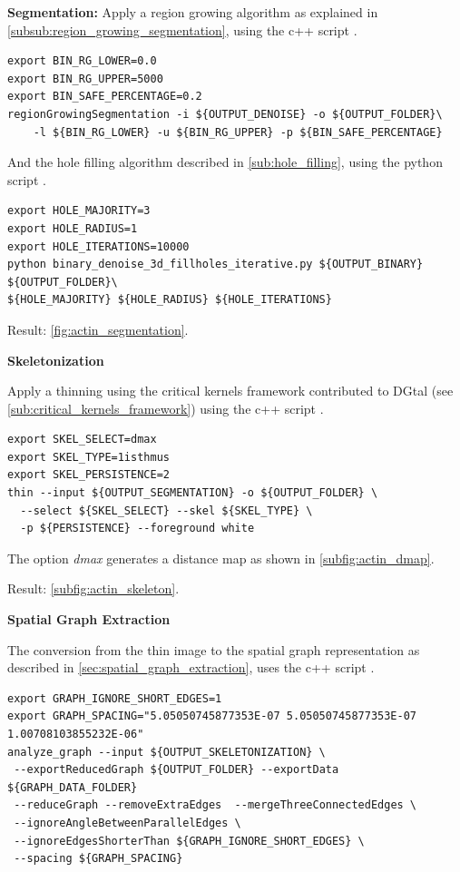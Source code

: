 \textbf{Segmentation:}
Apply a region growing algorithm as explained in \autoref{subsub:region_growing_segmentation},
using the c++ script   \cite{phcerdan_regionGrowingSegmentation_2018}.
\begin{verbatim}
export BIN_RG_LOWER=0.0
export BIN_RG_UPPER=5000
export BIN_SAFE_PERCENTAGE=0.2
regionGrowingSegmentation -i ${OUTPUT_DENOISE} -o ${OUTPUT_FOLDER}\
    -l ${BIN_RG_LOWER} -u ${BIN_RG_UPPER} -p ${BIN_SAFE_PERCENTAGE}
\end{verbatim}

And the hole filling algorithm described in \autoref{sub:hole_filling},
using the python script   \cite{phcerdan_binary_denoise_3d_fillholes_iterative_2018}.

\begin{verbatim}
export HOLE_MAJORITY=3
export HOLE_RADIUS=1
export HOLE_ITERATIONS=10000
python binary_denoise_3d_fillholes_iterative.py ${OUTPUT_BINARY} ${OUTPUT_FOLDER}\
${HOLE_MAJORITY} ${HOLE_RADIUS} ${HOLE_ITERATIONS}
\end{verbatim}

Result: \autoref{fig:actin_segmentation}.

\textbf{Skeletonization}

Apply a thinning using the critical kernels framework contributed to DGtal (see \autoref{sub:critical_kernels_framework})
using the c++ script   \cite{phcerdan_thin_2018}.

\begin{verbatim}
export SKEL_SELECT=dmax
export SKEL_TYPE=1isthmus
export SKEL_PERSISTENCE=2
thin --input ${OUTPUT_SEGMENTATION} -o ${OUTPUT_FOLDER} \
  --select ${SKEL_SELECT} --skel ${SKEL_TYPE} \
  -p ${PERSISTENCE} --foreground white
\end{verbatim}

The option \textit{dmax} generates a distance map as shown in \autoref{subfig:actin_dmap}.

Result: \autoref{subfig:actin_skeleton}.

\textbf{Spatial Graph Extraction}

The conversion from the thin image to the spatial graph representation as described in \autoref{sec:spatial_graph_extraction},
uses the c++ script   \cite{phcerdan_analyze_graph_2018}.

\begin{verbatim}
export GRAPH_IGNORE_SHORT_EDGES=1
export GRAPH_SPACING="5.05050745877353E-07 5.05050745877353E-07 1.00708103855232E-06"
analyze_graph --input ${OUTPUT_SKELETONIZATION} \
 --exportReducedGraph ${OUTPUT_FOLDER} --exportData ${GRAPH_DATA_FOLDER}
 --reduceGraph --removeExtraEdges  --mergeThreeConnectedEdges \
 --ignoreAngleBetweenParallelEdges \
 --ignoreEdgesShorterThan ${GRAPH_IGNORE_SHORT_EDGES} \
 --spacing ${GRAPH_SPACING}
\end{verbatim}

